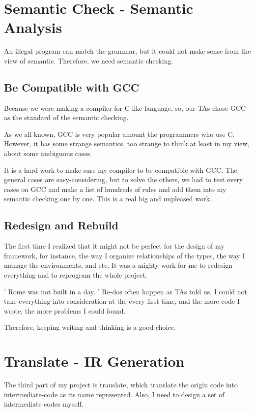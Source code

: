 \documentclass[preprint, 9pt]{sigplanconf}
\begin{document}
\section{Semantic Check - Semantic Analysis}

    An illegal program can match the grammar, but it could not make sense from the view of semantic.
    Therefore, we need semantic checking.

    \subsection{Be Compatible with GCC}
    Because we were making a compiler for C-like language, so, our TAs chose GCC as the standard of the semantic checking.

    As we all known, GCC is very popular amount the programmers who use C.
    However, it has some strange semantics, too strange to think at least in my view, about some ambiguous cases.

    It is a hard work to make sure my compiler to be compatible with GCC.
    The general cases are easy-considering, but to solve the others, we had to test every cases on GCC and make a list of hundreds of rules and add them into my semantic checking one by one.
    This is a real big and unpleased work.

    \subsection{Redesign and Rebuild}
    The first time I realized that it might not be perfect for the design of my framework, for instance, the way I organize relationships of the types, the way I manage the environments, and etc.
    It was a mighty work for me to redesign everything and to reprogram the whole project.

    ' Rome was not built in a day. '
    Re-dos often happen as TAs told us.
    I could not take everything into consideration at the every first time, and the more code I wrote, the more problems I could found.

    Therefore, keeping writing and thinking is a good choice.

\section{Translate - IR Generation}

    The third part of my project is translate, which translate the origin code into intermediate-code as its name represented.
    Also, I need to design a set of intermediate codes myself.
\end{document}
